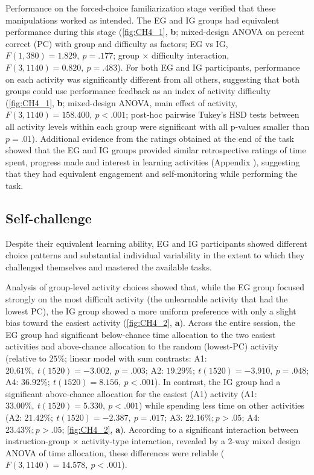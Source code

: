 Performance on the forced-choice familiarization stage verified that these manipulations worked as intended. The \ac{EG} and \ac{IG} groups had equivalent  performance during this stage (\cref{fig:CH4_1}, \textbf{b}; mixed-design ANOVA on percent correct (\ac{PC}) with group and difficulty as factors; \ac{EG} vs \ac{IG}, $F(1, 380) = 1.829,\ p = .177$; group $\times$ difficulty interaction, $F(3,1140) = 0.820,\ p = .483$). For both \ac{EG} and \ac{IG} participants, performance on each activity was significantly different from all others, suggesting that both groups could use performance feedback as an index of activity difficulty (\cref{fig:CH4_1}, \textbf{b}; mixed-design ANOVA, main effect of activity, $F(3,1140) = 158.400,\ p < .001$; post-hoc pairwise Tukey's HSD tests between all activity levels within each group were significant with  all p-values smaller than $p = .01$). Additional evidence from the ratings obtained at the end of the task showed that the \ac{EG} and \ac{IG} groups provided similar retrospective ratings of time spent, progress made and interest in learning activities (Appendix ), suggesting that they had equivalent engagement and self-monitoring while performing the task.

\subsection{Self-challenge} \label{CH4_SS_self_challenge}

Despite their equivalent learning ability, \ac{EG} and \ac{IG} participants showed different choice patterns and substantial individual variability in the extent to which they challenged themselves and mastered the available tasks. 

Analysis of group-level activity choices showed that, while the \ac{EG} group focused strongly on the most difficult activity (the unlearnable activity that had the lowest \ac{PC}), the \ac{IG} group showed a more uniform preference with only a slight bias toward the easiest activity (\cref{fig:CH4_2}, \textbf{a}). Across the entire session, the \ac{EG} group had significant below-chance time allocation to the two easiest activities and above-chance allocation to the random (lowest-PC) activity (relative to $25\%$; linear model with sum contrasts: A1: $20.61\%,\ t(1520) = -3.002,\ p = .003$; A2: $19.29\%;\ t(1520) = -3.910,\ p = .048$; A4: $36.92\%;\ t(1520) = 8.156,\ p < .001$). In contrast, the \ac{IG} group had a significant above-chance allocation for the easiest (A1) activity (A1: $33.00\%,\ t(1520) = 5.330,\ p < .001$) while spending less time on other activities (A2: $21.42\%;\ t(1520) = -2.387,\ p = .017$; A3: $22.16\%; p > .05$; A4: $23.43\%; p > .05$; \cref{fig:CH4_2}, \textbf{a}). According to a significant interaction between instruction-group $\times$ activity-type interaction, revealed by a 2-way mixed design ANOVA of time allocation, these differences were reliable ($F(3, 1140) = 14.578,\ p < .001$).

